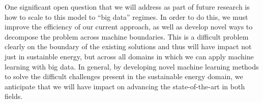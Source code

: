 \documentclass[12pt]{article}
\begin{document}
One significant open question that we will address as part of future research is how to scale to this model to ``big data'' regimes. In order to do this, we must improve the efficiency of our current approach, as well as develop novel ways to decompose the problem across machine boundaries. This is a difficult problem clearly on the boundary of the existing solutions and thus  will have impact not just in sustainble energy, but across all domains in which we can apply machine learning with big data. In general, by developing novel machine learning methods to solve the difficult challenges present in the sustainable energy domain, we anticipate that we will have impact on advancing the state-of-the-art in both fields.
\end{document}
